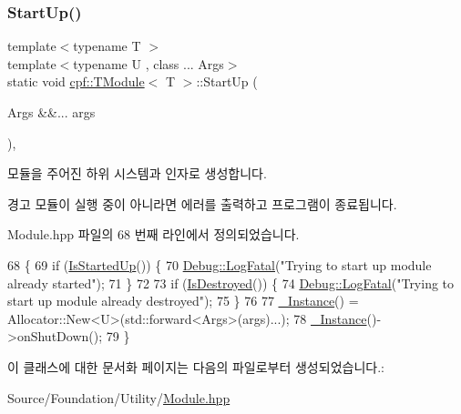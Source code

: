 \subsubsection{\texorpdfstring{Start\+Up()}{StartUp()}\hspace{0.1cm}{\footnotesize\ttfamily [2/2]}}
{\footnotesize\ttfamily template$<$typename T $>$ \\
template$<$typename U , class ... Args$>$ \\
static void \hyperlink{classcpf_1_1_t_module}{cpf\+::\+T\+Module}$<$ T $>$\+::Start\+Up (\begin{DoxyParamCaption}\item[{Args \&\&...}]{args }\end{DoxyParamCaption})\hspace{0.3cm}{\ttfamily [inline]}, {\ttfamily [static]}}

모듈을 주어진 하위 시스템과 인자로 생성합니다. \begin{DoxyWarning}{경고}
모듈이 실행 중이 아니라면 에러를 출력하고 프로그램이 종료됩니다. 
\end{DoxyWarning}


Module.\+hpp 파일의 68 번째 라인에서 정의되었습니다.


\begin{DoxyCode}
68                                             \{
69             \textcolor{keywordflow}{if} (\hyperlink{classcpf_1_1_t_module_a73732afee7131dad652bf3e00c75cef9}{IsStartedUp}()) \{
70                 \hyperlink{classcpf_1_1_debug_a22849847c74bcb444922c263c9ae6183}{Debug::LogFatal}(\textcolor{stringliteral}{"Trying to start up module already started"});
71             \}
72 
73             \textcolor{keywordflow}{if} (\hyperlink{classcpf_1_1_t_module_a9f70f0a70ac59b13b7a874f82c877337}{IsDestroyed}()) \{
74                 \hyperlink{classcpf_1_1_debug_a22849847c74bcb444922c263c9ae6183}{Debug::LogFatal}(\textcolor{stringliteral}{"Trying to start up module already destroyed"});
75             \}
76 
77             \hyperlink{classcpf_1_1_t_module_a06ab8af8ea6b294959937fd2bbc1e615}{\_Instance}() = Allocator::New<U>(std::forward<Args>(args)...);
78             \hyperlink{classcpf_1_1_t_module_a06ab8af8ea6b294959937fd2bbc1e615}{\_Instance}()->onShutDown();
79         \}
\end{DoxyCode}


이 클래스에 대한 문서화 페이지는 다음의 파일로부터 생성되었습니다.\+:\begin{DoxyCompactItemize}
\item 
Source/\+Foundation/\+Utility/\hyperlink{_module_8hpp}{Module.\+hpp}\end{DoxyCompactItemize}
